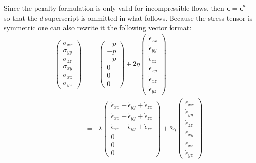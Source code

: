 Since the penalty formulation is only valid for incompressible flows, then 
$\dot{\bm \epsilon}=\dot{\bm \epsilon}^d$ so that the $d$ superscript is ommitted in what follows.
Because the stress tensor is symmetric one can also rewrite it the following vector format:
\begin{eqnarray}
\left(
\begin{array}{c}
\sigma_{xx}\\
\sigma_{yy}\\
\sigma_{zz}\\
\sigma_{xy}\\
\sigma_{xz}\\
\sigma_{yz}
\end{array}
\right)
&=&
\left(
\begin{array}{c}
-p\\
-p\\
-p\\
0\\
0\\
0
\end{array}
\right)
+2 \eta
\left(
\begin{array}{c}
\dot{\epsilon}_{xx}\\
\dot{\epsilon}_{yy}\\
\dot{\epsilon}_{zz}\\
\dot{\epsilon}_{xy}\\
\dot{\epsilon}_{xz}\\
\dot{\epsilon}_{yz}
\end{array}
\right)
\nonumber\\
&=&
\lambda
\left(
\begin{array}{c}
\dot{\epsilon}_{xx} + \dot{\epsilon}_{yy} + \dot{\epsilon}_{zz}\\
\dot{\epsilon}_{xx} + \dot{\epsilon}_{yy} + \dot{\epsilon}_{zz}\\
\dot{\epsilon}_{xx} + \dot{\epsilon}_{yy} + \dot{\epsilon}_{zz}\\
0 \\ 0 \\ 0
\end{array}
\right)
+2 \eta
\left(
\begin{array}{c}
\dot{\epsilon}_{xx}\\
\dot{\epsilon}_{yy}\\
\dot{\epsilon}_{zz}\\
\dot{\epsilon}_{xy}\\
\dot{\epsilon}_{xz}\\
\dot{\epsilon}_{yz}
\end{array}
\right)\nonumber\\

\end{eqnarray}
